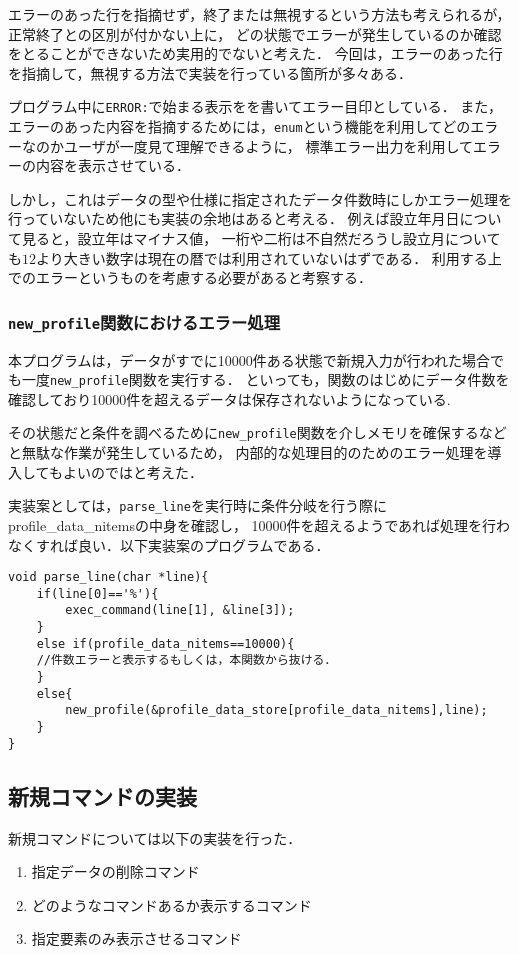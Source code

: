 \documentclass[a4j,11pt]{jarticle}
\begin{document}
エラーのあった行を指摘せず，終了または無視するという方法も考えられるが，正常終了との区別が付かない上に，
どの状態でエラーが発生しているのか確認をとることができないため実用的でないと考えた．
今回は，エラーのあった行を指摘して，無視する方法で実装を行っている箇所が多々ある．

プログラム中に\verb|ERROR:|で始まる表示をを書いてエラー目印としている．
また，エラーのあった内容を指摘するためには，\verb|enum|という機能を利用してどのエラーなのかユーザが一度見て理解できるように，
標準エラー出力を利用してエラーの内容を表示させている．

しかし，これはデータの型や仕様に指定されたデータ件数時にしかエラー処理を行っていないため他にも実装の余地はあると考える．
例えば設立年月日について見ると，設立年はマイナス値，
一桁や二桁は不自然だろうし設立月についても$12$より大きい数字は現在の暦では利用されていないはずである．
利用する上でのエラーというものを考慮する必要があると考察する．

\subsubsection{\texttt{new\_profile}関数におけるエラー処理}
本プログラムは，データがすでに10000件ある状態で新規入力が行われた場合でも一度\verb|new_profile|関数を実行する．
といっても，関数のはじめにデータ件数を確認しており10000件を超えるデータは保存されないようになっている.

その状態だと条件を調べるために\verb|new_profile|関数を介しメモリを確保するなどと無駄な作業が発生しているため，
内部的な処理目的のためのエラー処理を導入してもよいのではと考えた．

実装案としては，\verb|parse_line|を実行時に条件分岐を行う際にprofile\_data\_nitemsの中身を確認し，
10000件を超えるようであれば処理を行わなくすれば良い．以下実装案のプログラムである．
\begin{verbatim}
void parse_line(char *line){
    if(line[0]=='%'){
        exec_command(line[1], &line[3]);
    }
    else if(profile_data_nitems==10000){
    //件数エラーと表示するもしくは，本関数から抜ける．
    }
    else{
        new_profile(&profile_data_store[profile_data_nitems],line);
    }
}
\end{verbatim}

\subsection{新規コマンドの実装}
新規コマンドについては以下の実装を行った．
\begin{enumerate}
\setlength{\parskip}{2pt} \setlength{\itemsep}{2pt}
    \item 指定データの削除コマンド
    \item どのようなコマンドあるか表示するコマンド
    \item 指定要素のみ表示させるコマンド
\end{enumerate}
\end{document}
